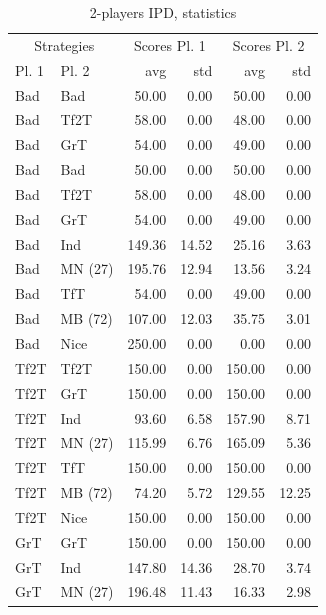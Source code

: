 \documentclass[journal,a4paper,10pt,twoside]{IEEEtran} %
\begin{document}
\begin{table}[ht]
    \caption{2-players IPD, statistics}
    \label{tab:ipd2p}
    \centering
    \begin{tabular}{llrrrr} \toprule
        \multicolumn{2}{c}{Strategies} & \multicolumn{2}{c}{Scores Pl. 1} & \multicolumn{2}{c}{Scores Pl. 2} \\
    	Pl. 1   & Pl. 2   &    avg &    std &    avg &    std \\ \midrule
    	Bad     & Bad     &  50.00 &   0.00 &  50.00 &   0.00 \\
    	Bad     & Tf2T    &  58.00 &   0.00 &  48.00 &   0.00 \\
    	Bad     & GrT     &  54.00 &   0.00 &  49.00 &   0.00 \\
    	Bad     & Bad     &  50.00 &   0.00 &  50.00 &   0.00 \\
    	Bad     & Tf2T    &  58.00 &   0.00 &  48.00 &   0.00 \\
    	Bad     & GrT     &  54.00 &   0.00 &  49.00 &   0.00 \\
    	Bad     & Ind     & 149.36 &  14.52 &  25.16 &   3.63 \\
    	Bad     & MN (27) & 195.76 &  12.94 &  13.56 &   3.24 \\
    	Bad     & TfT     &  54.00 &   0.00 &  49.00 &   0.00 \\
    	Bad     & MB (72) & 107.00 &  12.03 &  35.75 &   3.01 \\
    	Bad     & Nice    & 250.00 &   0.00 &   0.00 &   0.00 \\
    	Tf2T    & Tf2T    & 150.00 &   0.00 & 150.00 &   0.00 \\
    	Tf2T    & GrT     & 150.00 &   0.00 & 150.00 &   0.00 \\
    	Tf2T    & Ind     &  93.60 &   6.58 & 157.90 &   8.71 \\
    	Tf2T    & MN (27) & 115.99 &   6.76 & 165.09 &   5.36 \\
    	Tf2T    & TfT     & 150.00 &   0.00 & 150.00 &   0.00 \\
    	Tf2T    & MB (72) &  74.20 &   5.72 & 129.55 &  12.25 \\
    	Tf2T    & Nice    & 150.00 &   0.00 & 150.00 &   0.00 \\
    	GrT     & GrT     & 150.00 &   0.00 & 150.00 &   0.00 \\
    	GrT     & Ind     & 147.80 &  14.36 &  28.70 &   3.74 \\
    	GrT     & MN (27) & 196.48 &  11.43 &  16.33 &   2.98 \\

\end{tabular}
\end{table}
\end{document}
